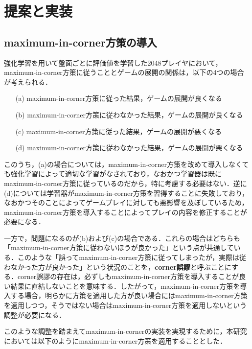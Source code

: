 \documentclass{suribt}
\begin{document}
\chapter{提案と実装}
\section{maximum-in-corner方策の導入}
強化学習を用いて盤面ごとに評価値を学習した2048プレイヤにおいて，maximum-in-corner方策に従うこととゲームの展開の関係は，以下の4つの場合が考えられる．

\begin{enumerate}
\item[(a)] maximum-in-corner方策に従った結果，ゲームの展開が良くなる
\item[(b)] maximum-in-corner方策に従わなかった結果，ゲームの展開が良くなる
\item[(c)] maximum-in-corner方策に従った結果，ゲームの展開が悪くなる
\item[(d)] maximum-in-corner方策に従わなかった結果，ゲームの展開が悪くなる
\end{enumerate}

このうち，(a)の場合については，maximum-in-corner方策を改めて導入しなくても強化学習によって適切な学習がなされており，なおかつ学習器は既にmaximum-in-corner方策に従っているのだから，特に考慮する必要はない．逆に(d)については学習器がmaximum-in-corner方策を習得することに失敗しており，なおかつそのことによってゲームプレイに対しても悪影響を及ぼしているため，maximum-in-corner方策を導入することによってプレイの内容を修正することが必要になる．

一方で，問題になるのが(b)および(c)の場合である．これらの場合はどちらも「maximum-in-corner方策に従わないほうが良かった」という点が共通している．このような「誤ってmaximum-in-corner方策に従ってしまったが，実際は従わなかった方が良かった」という状況のことを，\textbf{corner誤謬}と呼ぶことにする．corner誤謬の存在は，必ずしもmaximum-in-corner方策を導入することが良い結果に直結しないことを意味する．したがって，maximum-in-corner方策を導入する場合，明らかに方策を適用した方が良い場合にはmaximum-in-corner方策を適用しつつ，そうではない場合はmaximum-in-corner方策を適用しないという調整が必要になる．

このような調整を踏まえてmaximum-in-cornerの実装を実現するために，本研究においては以下のようにmaximum-in-corner方策を適用することとした．
\end{document}
